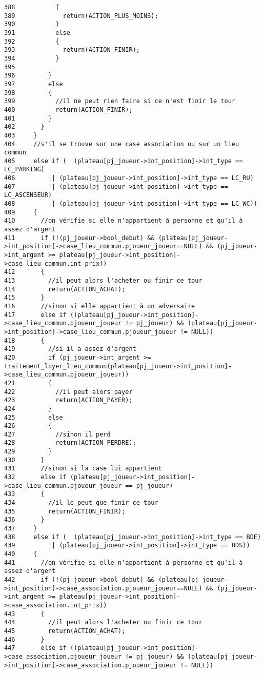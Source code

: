 \begin{Code}
\begin{verbatim}
388           {
389             return(ACTION_PLUS_MOINS);
390           }
391           else 
392           {
393             return(ACTION_FINIR);
394           }
395           
396         }
397         else
398         {
399           //il ne peut rien faire si ce n'est finir le tour
400           return(ACTION_FINIR);
401         }
402       }
403     }
404     //s'il se trouve sur une case association ou sur un lieu commun
405     else if (  (plateau[pj_joueur->int_position]->int_type == LC_PARKING)
406         || (plateau[pj_joueur->int_position]->int_type == LC_RU)
407         || (plateau[pj_joueur->int_position]->int_type == LC_ASCENSEUR)
408         || (plateau[pj_joueur->int_position]->int_type == LC_WC))
409     {
410       //on vérifie si elle n'appartient à personne et qu'il à assez d'argent
411       if (!(pj_joueur->bool_debut) && (plateau[pj_joueur->int_position]->case_lieu_commun.pjoueur_joueur==NULL) && (pj_joueur->int_argent >= plateau[pj_joueur->int_position]->case_lieu_commun.int_prix))
412       {
413         //il peut alors l'acheter ou finir ce tour
414         return(ACTION_ACHAT);
415       }
416       //sinon si elle appartient à un adversaire
417       else if ((plateau[pj_joueur->int_position]->case_lieu_commun.pjoueur_joueur != pj_joueur) && (plateau[pj_joueur->int_position]->case_lieu_commun.pjoueur_joueur != NULL))
418       {
419         //si il a assez d'argent
420         if (pj_joueur->int_argent >= traitement_loyer_lieu_commun(plateau[pj_joueur->int_position]->case_lieu_commun.pjoueur_joueur))
421         {
422           //il peut alors payer
423           return(ACTION_PAYER);
424         }
425         else
426         {
427           //sinon il perd
428           return(ACTION_PERDRE);
429         }
430       }
431       //sinon si la case lui appartient
432       else if (plateau[pj_joueur->int_position]->case_lieu_commun.pjoueur_joueur == pj_joueur)
433       {
434         //il le peut que finir ce tour
435         return(ACTION_FINIR);
436       }
437     }
438     else if (  (plateau[pj_joueur->int_position]->int_type == BDE)
439         || (plateau[pj_joueur->int_position]->int_type == BDS))
440     {
441       //on vérifie si elle n'appartient à personne et qu'il à assez d'argent
442       if (!(pj_joueur->bool_debut) && (plateau[pj_joueur->int_position]->case_association.pjoueur_joueur==NULL) && (pj_joueur->int_argent >= plateau[pj_joueur->int_position]->case_association.int_prix))
443       {
444         //il peut alors l'acheter ou finir ce tour
445         return(ACTION_ACHAT);
446       }
447       else if ((plateau[pj_joueur->int_position]->case_association.pjoueur_joueur != pj_joueur) && (plateau[pj_joueur->int_position]->case_association.pjoueur_joueur != NULL))

\end{verbatim}
\end{Code}
